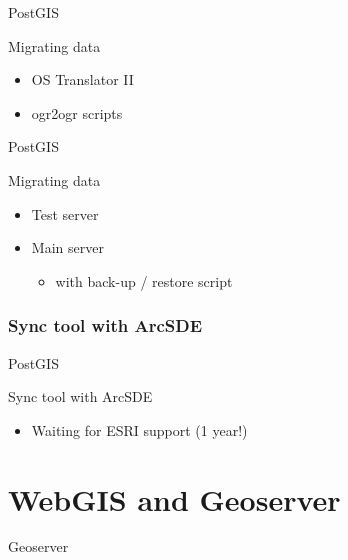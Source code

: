 \begin{frame}{PostGIS}
	\begin{block}{Migrating data}
		\begin{itemize}
			\item OS Translator II
			\item ogr2ogr scripts
		\end{itemize}
	\end{block}	
\end{frame}

\begin{frame}{PostGIS}
	\begin{block}{Migrating data}
		\begin{itemize}
			\item Test server
			\item Main server
			\begin{itemize}
				\item with back-up / restore script
			\end{itemize}
		\end{itemize}
	\end{block}	
\end{frame}

\subsubsection{Sync tool with ArcSDE}

\begin{frame}{PostGIS}
	\begin{block}{Sync tool with ArcSDE}
		\begin{itemize}
			\item Waiting for ESRI support (1 year!)
		\end{itemize}
	\end{block}	
\end{frame}

\section{WebGIS and Geoserver}
\begin{frame}{Geoserver}
\end{frame}

